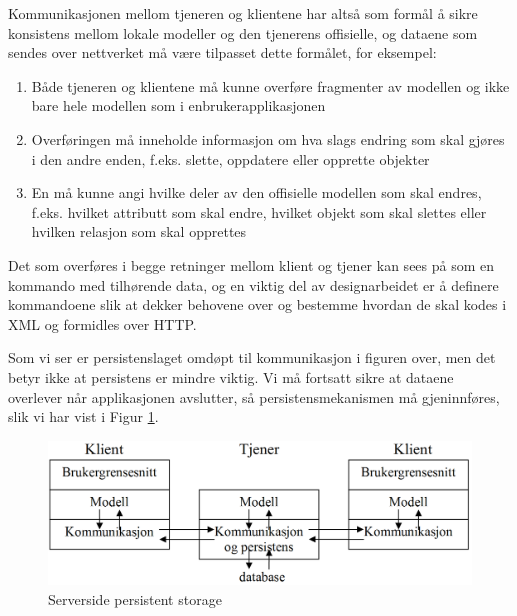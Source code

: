 Kommunikasjonen mellom tjeneren og klientene har altså som formål å sikre konsistens mellom lokale modeller og den tjenerens offisielle, og dataene som sendes over nettverket må være tilpasset dette formålet, for eksempel:

\begin{enumerate}

\item
Både tjeneren og klientene må kunne overføre fragmenter av modellen og ikke bare hele modellen som i enbrukerapplikasjonen

\item
Overføringen må inneholde informasjon om hva slags endring som skal gjøres i den andre enden, f.eks. slette, oppdatere eller opprette objekter

\item
En må kunne angi hvilke deler av den offisielle modellen som skal endres, f.eks. hvilket attributt som skal endre, hvilket objekt som skal slettes eller hvilken relasjon som skal opprettes

\end{enumerate}

Det som overføres i begge retninger mellom klient og tjener kan sees på som en kommando med tilhørende data, og en viktig del av designarbeidet er å definere kommandoene slik at dekker behovene over og bestemme hvordan de skal kodes i XML og formidles over HTTP.

Som vi ser er persistenslaget omdøpt til kommunikasjon i figuren over, men det betyr ikke at persistens er mindre viktig. Vi må fortsatt sikre at dataene overlever når applikasjonen avslutter, så persistensmekanismen må gjeninnføres, slik vi har vist i Figur \ref{fig:database-based-server-persistence}.

\begin{figure}[H]
    \centering
    \includegraphics[scale=0.35]{resources/database-based-server-persistence.PNG}
    \caption{Serverside persistent storage}
    \label{fig:database-based-server-persistence}
\end{figure}

